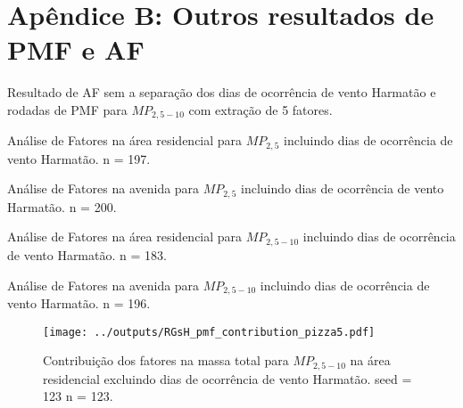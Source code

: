\chapter{Apêndice B: Outros resultados de PMF e AF \label{apendice:pmf_fa}}

Resultado de AF sem a separação dos dias de ocorrência de vento Harmatão e 
rodadas de PMF para $MP_{2,5-10}$ com extração de 5 fatores. 

\begin{table}[H]
  \centering
  
  \caption{Análise de Fatores na área residencial para $MP_{2,5}$
          incluindo dias de ocorrência de vento Harmatão. n = 197.
          \label{table:AF_RFcH5}}
\end{table}

\begin{table}[H]
  \centering
  
  \caption{Análise de Fatores na avenida para $MP_{2,5}$
           incluindo dias de ocorrência de vento Harmatão. n = 200.
          \label{table:AF_TFcH5}}
\end{table}

\begin{table}[H]
  \centering
  
  \caption{Análise de Fatores na área residencial para $MP_{2,5-10}$
          incluindo dias de ocorrência de vento Harmatão. n = 183.
          \label{table:AG_RFcH4}}
\end{table}

\begin{table}[H]
  \centering
  
  \caption{Análise de Fatores na avenida para $MP_{2,5-10}$
           incluindo dias de ocorrência de vento Harmatão. n = 196.
          \label{table:AF_TGcH4}}
\end{table}

\begin{landscape}
  \begin{figure}
    \centering
    \begin{minipage}[b]{0.45\linewidth}
      \texttt{[image: ../outputs/RGsH\_pmf\_contribution\_pizza5.pdf]}
      \caption{Contribuição dos fatores na massa total para $MP_{2,5-10}$ na área
               residencial excluindo dias de ocorrência de vento Harmatão. seed = 123 n = 123.
               \label{fig:RGsH_contribution5}}
    \end{minipage}%
    \hspace{0.5cm}
    \begin{minipage}[b]{0.45\linewidth}
      
    \end{minipage}
  \end{figure}
\end{landscape}

